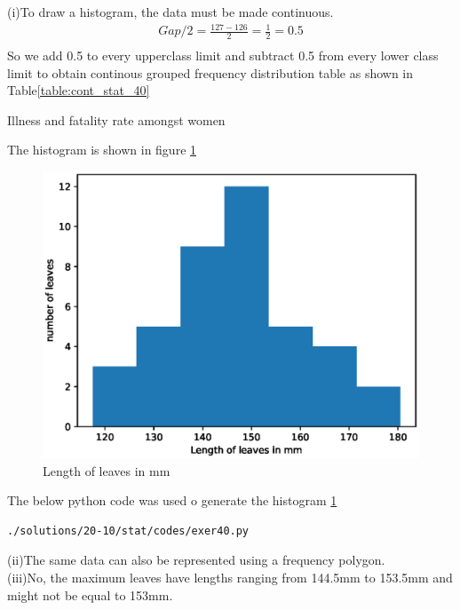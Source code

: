 (i)To draw a histogram, the data must be made continuous.\\
\begin{align}
Gap/2=\frac{127-126}{2}=\frac{1}{2}=0.5\\
\end{align}
So we add 0.5 to every upperclass limit and subtract 0.5 from every lower class limit to obtain continous grouped frequency distribution table as shown in Table\ref{table:cont_stat_40}
\begin{table}[ht!]
\centering

\caption{Illness and fatality rate amongst women}
\label{table:cont_stat_40}
\end{table}
The histogram is shown in figure \ref{fig:hist40_py}
\begin{figure}[!ht]
\centering
\includegraphics[width=\columnwidth]{./solutions/20-10/stat/codes/pyfigs/exer40.eps}
\caption{Length of leaves in mm}
\label{fig:hist40_py}
\end{figure}
The below python code was used o generate the histogram \ref{fig:hist40_py}
\begin{lstlisting}
./solutions/20-10/stat/codes/exer40.py
\end{lstlisting}
(ii)The same data can also be represented using a frequency polygon.\\
(iii)No, the maximum leaves have lengths ranging from 144.5mm to 153.5mm and might not be equal to 153mm.\\
